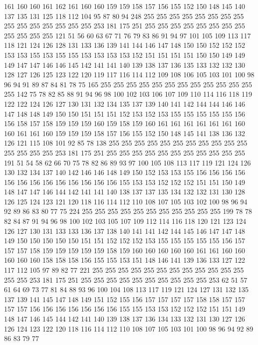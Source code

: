 161 160 160 161 162 161 160 160 159 159 158 157 156 155 152 150 148 145 140 137
135 131 125 118 112 104 95 87 80 94 248 255 255 255 255 255 255 255 255 255
255 255 255 255 255 255 253 181 175 251 255 255 255 255 255 255 255 255 255 255
255 255 121 51 56 60 63 67 71 76 79 83 86 91 94 97 101 105 109 113
117 118 121 124 126 128 131 133 136 139 141 144 146 147 148 150 150 152 152 152
153 153 155 153 155 155 153 153 153 153 152 151 151 151 151 150 150 149 149 149
147 147 146 146 145 142 141 141 140 139 138 137 136 135 133 132 132 130 128 127
126 125 123 122 120 119 117 116 114 112 109 108 106 105 103 101 100 98 96 94
91 89 87 84 81 78 75 165 255 255 255 255 255 255 255 255 255 255 255 255
255 142 75 78 82 85 88 91 94 96 98 100 102 103 106 107 109 110 114 116
118 119 122 122 124 126 127 130 131 132 134 135 137 139 140 141 142 144 144 146
146 147 148 148 149 150 150 151 151 151 152 153 152 153 155 155 155 155 155 156
156 158 157 158 159 159 159 160 159 158 159 160 161 161 161 161 161 161 160 160
161 161 160 159 159 159 158 157 156 155 152 150 148 145 141 138 136 132 126 121
115 108 101 92 85 78 138 255 255 255 255 255 255 255 255 255 255 255 255 255
255 255 253 181 175 251 255 255 255 255 255 255 255 255 255 255 255 191 51 54
58 62 66 70 75 78 82 86 89 93 97 100 105 108 113 117 119 121 124 126
130 132 134 137 140 142 146 146 148 149 150 152 153 153 155 156 156 156 156 156
156 156 156 156 156 156 156 156 155 153 153 152 152 152 151 151 150 149 148 147
147 146 144 142 141 141 140 138 137 137 135 134 132 132 131 130 128 126 125 124
123 121 120 118 116 114 112 110 108 107 105 103 102 100 98 96 94 92 89 86
83 80 77 75 224 255 255 255 255 255 255 255 255 255 255 255 199 78 78 82
84 87 91 94 96 98 100 102 103 105 107 109 112 114 116 118 120 121 123 124
126 127 130 131 133 133 136 137 138 140 141 141 142 144 145 146 147 147 148 149
150 150 150 150 150 151 151 152 152 152 153 155 155 155 155 155 156 157 157 157
158 159 159 159 159 159 158 159 160 160 160 160 160 161 161 160 160 160 160 160
158 158 158 156 155 155 153 151 148 146 141 139 136 133 127 122 117 112 105 97
89 82 77 221 255 255 255 255 255 255 255 255 255 255 255 255 255 255 253 181
175 251 255 255 255 255 255 255 255 255 255 255 253 62 51 57 61 64 69 73
77 81 84 88 93 96 100 104 108 113 117 119 121 124 127 131 132 135 137 139
141 145 147 148 149 151 152 155 156 157 157 157 157 158 158 157 157 157 157 156
156 156 156 156 156 156 155 155 153 153 152 152 152 151 151 149 148 147 146 145
144 142 141 140 139 138 137 136 134 133 132 131 130 127 126 126 124 123 122 120
118 116 114 112 110 108 107 105 103 101 100 98 96 94 92 89 86 83 79 77
